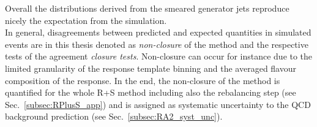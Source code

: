 Overall the distributions derived from the smeared generator jets reproduce nicely the expectation from the simulation. \\
In general, disagreements between predicted and expected quantities in simulated events are in this thesis denoted as \textit{non-closure} of the method and the respective tests of the agreement \textit{closure tests}. Non-closure can occur for instance due to the limited granularity of the response template binning and the averaged flavour composition of the response. In the end, the non-closure of the method is quantified for the whole R+S method including also the rebalancing step (see Sec.~\ref{subsec:RPlusS_app}) and is assigned as systematic uncertainty to the QCD background prediction (see Sec.~\ref{subsec:RA2_syst_unc}). 


